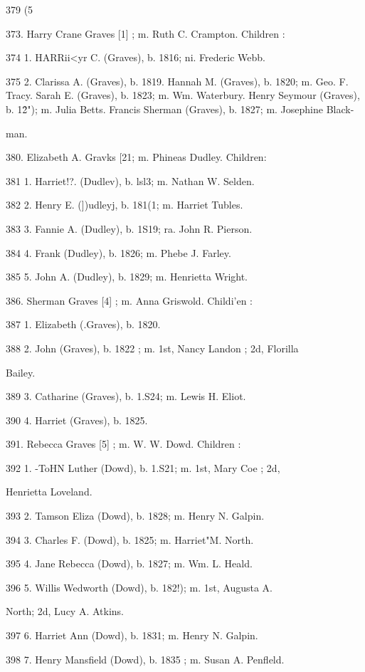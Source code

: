 \documentclass{book}
\begin{document}
379 (5 




373. Harry Crane Graves [1] ; m. Ruth C. Crampton. Children : 

374 1. HARRii<yr C. (Graves), b. 1816; ni. Frederic Webb. 

375 2. Clarissa A. (Graves), b. 1819. 
Hannah M. (Graves), b. 1820; m. Geo. F. Tracy. 
Sarah E. (Graves), b. 1823; m. Wm. Waterbury. 
Henry Seymour (Graves), b. 1\^2"); m. Julia Betts. 
Francis Sherman (Graves), b. 1827; m. Josephine Black- 

man. 

380. Elizabeth A. Gravks [21; m. Phineas Dudley. Children: 

381 1. Harriet!?. (Dudlev), b. lsl3; m. Nathan W. Selden. 

382 2. Henry E. (])udleyj, b. 181(1; m. Harriet Tubles. 

383 3. Fannie A. (Dudley), b. 1S19; ra. John R. Pierson. 

384 4. Frank (Dudley), b. 1826; m. Phebe J. Farley. 

385 5. John A. (Dudley), b. 1829; m. Henrietta Wright. 

386. Sherman Graves [4] ; m. Anna Griswold. Childi'en : 

387 1. Elizabeth (.Graves), b. 1820. 

388 2. John (Graves), b. 1822 ; m. 1st, Nancy Landon ; 2d, Florilla 

Bailey. 

389 3. Catharine (Graves), b. 1.S24; m. Lewis H. Eliot. 

390 4. Harriet (Graves), b. 1825. 

391. Rebecca Graves [5] ; m. W. W. Dowd. Children : 

392 1. -ToHN Luther (Dowd), b. 1.S21; m. 1st, Mary Coe ; 2d, 

Henrietta Loveland. 

393 2. Tamson Eliza (Dowd), b. 1828; m. Henry N. Galpin. 

394 3. Charles F. (Dowd), b. 1825; m. Harriet"M. North. 

395 4. Jane Rebecca (Dowd), b. 1827; m. Wm. L. Heald. 

396 5. Willis Wedworth (Dowd), b. 182!); m. 1st, Augusta A. 

North; 2d, Lucy A. Atkins. 

397 6. Harriet Ann (Dowd), b. 1831; m. Henry N. Galpin. 

398 7. Henry Mansfield (Dowd), b. 1835 ; m. Susan A. Penfleld. 
\end{document}
